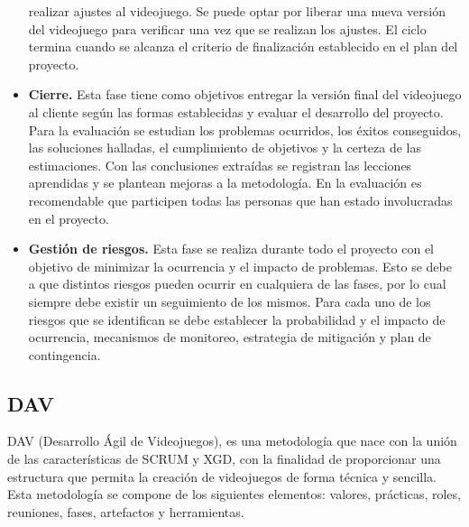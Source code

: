 \documentclass[a4paper, openright, 12pt]{report}
\begin{document}
\begin{itemize}
realizar ajustes al videojuego. Se puede optar por liberar una nueva versión
del videojuego para verificar una vez que se realizan los ajustes. El ciclo
termina cuando se alcanza el criterio de finalización establecido en el plan
del proyecto. \cite{Acerenza2009}
\item \textbf{Cierre.} Esta fase tiene como objetivos entregar la versión final del videojuego al cliente según las formas establecidas y evaluar el desarrollo del proyecto. Para la evaluación se estudian los problemas ocurridos, los éxitos conseguidos, las soluciones halladas, el cumplimiento de objetivos y la certeza de las estimaciones. Con las conclusiones extraídas se registran las lecciones
aprendidas y se plantean mejoras a la metodología. En la evaluación es recomendable que participen todas las personas que han estado involucradas
en el proyecto. \cite{Acerenza2009}
\item \textbf{Gestión de riesgos.} Esta fase se realiza durante todo el proyecto con el objetivo de minimizar la ocurrencia y el impacto de problemas. Esto se debe a que distintos riesgos pueden ocurrir en cualquiera de las fases, por lo cual siempre debe existir un seguimiento de los mismos. Para cada uno de los
riesgos que se identifican se debe establecer la probabilidad y el impacto
de ocurrencia, mecanismos de monitoreo, estrategia de mitigación y plan de
contingencia. \cite{Acerenza2009}
\end{itemize} 

\subsection*{DAV}
\justify
DAV (Desarrollo Ágil de Videojuegos), es una metodología que nace con la unión
de las características de SCRUM y XGD, con la finalidad de proporcionar una
estructura que permita la creación de videojuegos de forma técnica y sencilla.
Esta metodología se compone de los siguientes elementos: valores, prácticas, roles, reuniones, fases, artefactos y herramientas. \cite{Implementacion2011}
\end{document}
